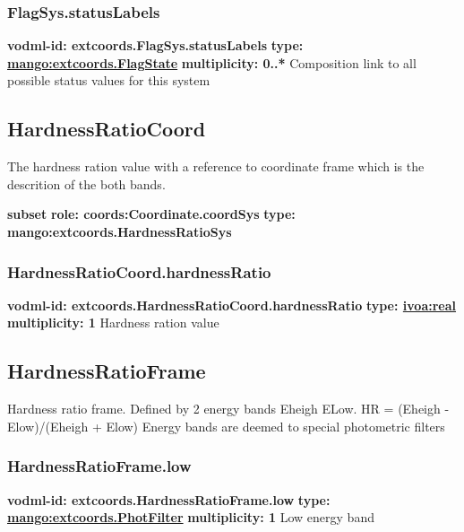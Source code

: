     \subsubsection{FlagSys.statusLabels}
      \textbf{vodml-id: extcoords.FlagSys.statusLabels} \newline
      \textbf{type: \hyperref[sect:extcoords.FlagState]{mango:extcoords.FlagState}} \newline
      \textbf{multiplicity: 0..*} \newline 
      Composition link to all possible status values for this system

  \subsection{HardnessRatioCoord}
  \label{sect:extcoords.HardnessRatioCoord}
    The hardness ration value with a reference to coordinate frame which is the descrition of the both bands.

    \noindent \textbf{subset} \newline
    \indent   \textbf{role: coords:Coordinate.coordSys} \newline
    \indent   \textbf{type:  mango:extcoords.HardnessRatioSys} \newline


    \subsubsection{HardnessRatioCoord.hardnessRatio}
      \textbf{vodml-id: extcoords.HardnessRatioCoord.hardnessRatio} \newline
      \textbf{type: \hyperref[sect:ivoa]{ivoa:real}} \newline
      \textbf{multiplicity: 1} \newline 
      Hardness ration value

  \subsection{HardnessRatioFrame}
  \label{sect:extcoords.HardnessRatioFrame}
    Hardness ratio frame. Defined by 2 energy bands Eheigh ELow. HR = (Eheigh - Elow)/(Eheigh + Elow) Energy bands are deemed to special photometric filters

    \subsubsection{HardnessRatioFrame.low}
      \textbf{vodml-id: extcoords.HardnessRatioFrame.low} \newline
      \textbf{type: \hyperref[sect:extcoords.PhotFilter]{mango:extcoords.PhotFilter}} \newline
      \textbf{multiplicity: 1} \newline 
      Low energy band

